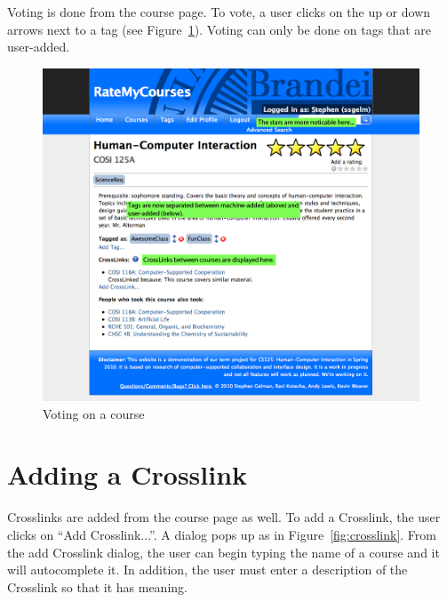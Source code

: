 \documentclass[12pt]{report}
\begin{document}
Voting is done from the course page.  To vote, a user clicks on the up or down arrows next to a tag (see Figure~\ref{fig:vote}).  Voting can only be done on tags that are user-added.

\begin{figure}
\includegraphics[width=\textwidth]{narrative-4.png}
\caption{Voting on a course}
\label{fig:vote}
\end{figure}

\section{Adding a Crosslink}

Crosslinks are added from the course page as well.  To add a Crosslink, the user clicks on ``Add Crosslink...''.  A dialog pops up as in Figure~\ref{fig:crosslink}. From the add Crosslink dialog, the user can begin typing the name of a course and it will autocomplete it.  In addition, the user must enter a description of the Crosslink so that it has meaning.
\end{document}

